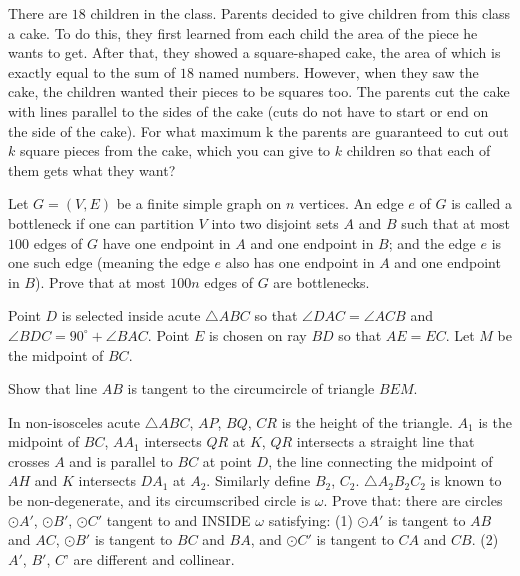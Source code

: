 \documentclass[11pt]{scrartcl}
\begin{document}
\begin{problem}[208479683430579745]
	There are $18$ children in the class. Parents decided to give children from this class a cake. To do this, they first learned from each child the area of the piece he wants to get. After that, they showed a square-shaped cake, the area of which is exactly equal to the sum of $18$ named numbers. However, when they saw the cake, the children wanted their pieces to be squares too. The parents cut the cake with lines parallel to the sides of the cake (cuts do not have to start or end on the side of the cake). For what maximum k the parents are guaranteed to cut out $k$ square pieces from the cake, which you can give to $k$ children so that each of them gets what they want?
\end{problem}
\begin{problem}[472882074231586]
Let $G = (V, E)$ be a finite simple graph on $n$ vertices. An edge $e$ of $G$ is called a bottleneck if one can partition $V$ into two disjoint sets $A$ and $B$ such that
at most $100$ edges of $G$ have one endpoint in $A$ and one endpoint in $B$; and
the edge $e$ is one such edge (meaning the edge $e$ also has one endpoint in $A$ and one endpoint in $B$).
Prove that at most $100n$ edges of $G$ are bottlenecks.
\end{problem}
\begin{problem}[978369715927760]
Point $D$ is selected inside acute $\triangle ABC$ so that $\angle DAC = \angle ACB$ and $\angle BDC = 90^{\circ} + \angle BAC$. Point $E$ is chosen on ray $BD$ so that $AE = EC$. Let $M$ be the midpoint of $BC$.

Show that line $AB$ is tangent to the circumcircle of triangle $BEM$.
\end{problem}
\begin{problem}[1293772592063302344]
In non-isosceles acute ${}{\triangle ABC}$, $AP$, $BQ$, $CR$ is the height of the triangle. $A_1$ is the midpoint of $BC$, $AA_1$ intersects $QR$ at $K$, $QR$ intersects a straight line that crosses ${A}$ and is parallel to $BC$ at point ${D}$, the line connecting the midpoint of $AH$ and ${K}$ intersects $DA_1$ at $A_2$. Similarly define $B_2$, $C_2$. ${}\triangle A_2B_2C_2$ is known to be non-degenerate, and its circumscribed circle is $\omega$. Prove that: there are circles $\odot A'$, $\odot B'$, $\odot C'$ tangent to and INSIDE $\omega$ satisfying:
(1) $\odot A'$ is tangent to $AB$ and $AC$, $\odot B'$ is tangent to $BC$ and $BA$, and $\odot C'$ is tangent to $CA$ and $CB$.
(2) $A'$, $B'$, $C$' are different and collinear.
\end{problem}
\end{document}
